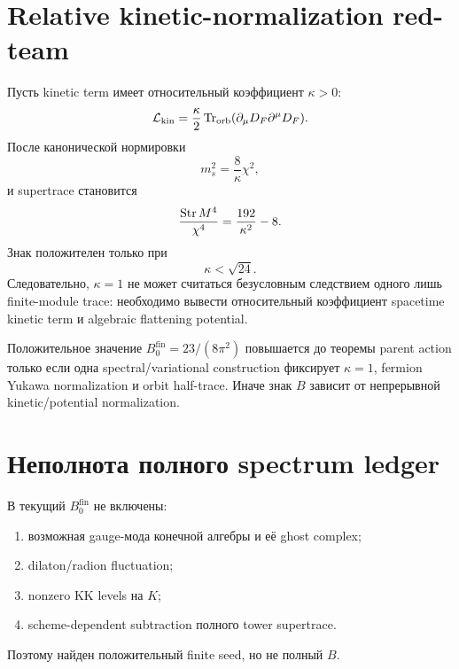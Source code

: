 \section{Relative kinetic-normalization red-team}

Пусть kinetic term имеет относительный коэффициент \(\kappa>0\):
\begin{equation}
 \mathcal L_{\mathrm{kin}}
 =\frac{\kappa}{2}
 \operatorname{Tr}_{\mathrm{orb}}(\partial_\mu D_F\partial^\mu D_F).
\end{equation}
После канонической нормировки
\begin{equation}
 m_s^2=\frac8\kappa\chi^2,
\end{equation}
и supertrace становится
\begin{equation}
 \frac{\operatorname{Str} M^4}{\chi^4}
 =\frac{192}{\kappa^2}-8.
\end{equation}
Знак положителен только при
\begin{equation}
 \kappa<\sqrt{24}.
\end{equation}
Следовательно, \(\kappa=1\) не может считаться безусловным следствием
одного лишь finite-module trace: необходимо вывести относительный
коэффициент spacetime kinetic term и algebraic flattening potential.

\begin{nogocriterion}
Положительное значение \(B_0^{\mathrm{fin}}=23/(8\pi^2)\) повышается до
теоремы parent action только если одна spectral/variational construction
фиксирует \(\kappa=1\), fermion Yukawa normalization и orbit half-trace.
Иначе знак \(B\) зависит от непрерывной kinetic/potential normalization.
\end{nogocriterion}

\section{Неполнота полного spectrum ledger}

В текущий \(B_0^{\mathrm{fin}}\) не включены:
\begin{enumerate}
 \item возможная gauge-мода конечной алгебры и её ghost complex;
 \item dilaton/radion fluctuation;
 \item nonzero KK levels на \(K\);
 \item scheme-dependent subtraction полного tower supertrace.
\end{enumerate}
Поэтому найден положительный finite seed, но не полный \(B\).

